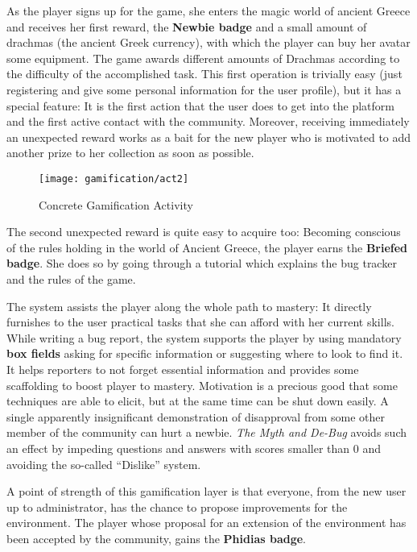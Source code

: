  As the player signs up for the game, she enters the magic world of ancient Greece and receives her first reward, the \textbf{Newbie badge} and a small amount of drachmas (the ancient Greek currency), with which the player can buy her avatar some equipment. The game awards different amounts of Drachmas according to the difficulty of the accomplished task. This first operation is trivially easy (just registering and give some personal information for the user profile), but it has a special feature: It is the first action that the user does to get into the platform and the first active contact with the community. Moreover, receiving immediately an unexpected reward works as a bait for the new player who is motivated to add another prize to her collection as soon as possible. 

\begin{figure}[t]
\centering
\texttt{[image: gamification/act2]}
\caption{Concrete Gamification Activity}
\label{fig-act2}
\end{figure}

 The second unexpected reward is quite easy to acquire too: Becoming conscious of the rules holding in the world of Ancient Greece, the player earns the \textbf{Briefed badge}. She does so by going through a tutorial which explains the bug tracker and the rules of the game.

The system assists the player along the whole path to mastery: It directly furnishes to the user practical tasks that she can afford with her current skills. While writing a bug report, the system supports the player by using mandatory \textbf{box fields} asking for specific information or suggesting where to look to find it. It helps reporters to not forget essential information and provides some scaffolding to boost player to mastery. Motivation is a precious good that some techniques are able to elicit, but at the same time can be shut down easily. A single apparently insignificant demonstration of disapproval from some other member of the community can hurt a newbie. \textit{The Myth and De-Bug} avoids such an effect by impeding questions and answers with scores smaller than 0 and avoiding the so-called ``Dislike'' system.

 A point of strength of this gamification layer is that everyone, from the new user up to administrator, has the chance to propose improvements for the  environment. The player whose proposal for an extension of the environment has been accepted by the community, gains the \textbf{Phidias badge}. 

